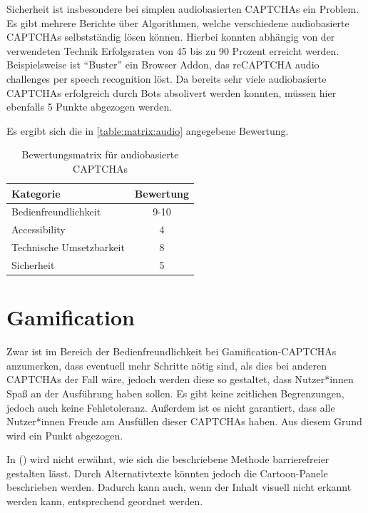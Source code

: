 Sicherheit ist insbesondere bei simplen audiobasierten CAPTCHAs ein Problem.
Es gibt mehrere Berichte über Algorithmen, welche verschiedene audiobasierte CAPTCHAs selbstständig lösen können.
Hierbei konnten abhängig von der verwendeten Technik Erfolgsraten von 45 bis zu 90 Prozent erreicht werden.
Beispielsweise ist “Buster” ein Browser Addon, das reCAPTCHA audio challenges per speech recognition löst.
Da bereits sehr viele audiobasierte CAPTCHAs erfolgreich durch Bots absolivert werden konnten,
müssen hier ebenfalls 5 Punkte abgezogen werden.

Es ergibt sich die in \autoref{table:matrix:audio} angegebene Bewertung.

\begin{table}[h!]
    \caption{Bewertungsmatrix für audiobasierte CAPTCHAs}
    \begin{center}
        \begin{tabular}{l|c}
            Kategorie                       & Bewertung \\\hline
            Bedienfreundlichkeit            & 9-10         \\
            Accessibility                   & 4        \\
            Technische Umsetzbarkeit        & 8         \\
            Sicherheit                      & 5         
        \end{tabular}
    \end{center}
    \label{table:matrix:audio}
\end{table}

\section{Gamification}
Zwar ist im Bereich der Bedienfreundlichkeit bei Gamification-CAPTCHAs anzumerken, 
dass eventuell mehr Schritte nötig sind, als dies bei anderen CAPTCHAs der Fall wäre,
jedoch werden diese so gestaltet, dass Nutzer*innen Spaß an der Ausführung haben sollen. 
Es gibt keine zeitlichen Begrenzungen, jedoch auch keine Fehletoleranz.
Außerdem ist es nicht garantiert, dass alle Nutzer*innen Freude am Ausfüllen dieser CAPTCHAs haben.
Aus diesem Grund wird ein Punkt abgezogen.

In  (\cite{gamified}) wird nicht erwähnt, wie sich die beschriebene Methode barrierefreier gestalten lässt.
Durch Alternativtexte könnten jedoch die Cartoon-Panele beschrieben werden.
Dadurch kann auch, wenn der Inhalt visuell nicht erkannt werden kann, entsprechend geordnet werden.

